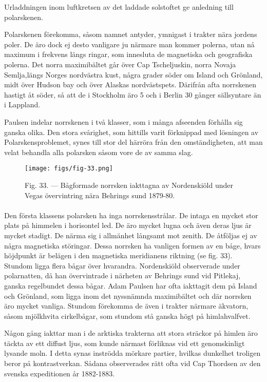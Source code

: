 \documentclass[a4paper, 12pt, oneside, swedish]{article}
\begin{document}
Urladdningen inom luftkretsen av det laddade solstoftet ge anledning till polarskenen.

Polarskenen förekomma, såsom namnet antyder, ymnigast i trakter nära jordens poler. De äro dock ej desto vanligare ju närmare man kommer polerna, utan nå maximum i frekvens längs ringar, som innesluta de magnetiska och geografiska polerna. Det norra maximibältet går över Cap Tscheljuskin, norra Novaja Semlja,längs Norges nordvästra kust, några grader söder om Island och Grönland, midt över Hudson bay och över Alaskas nordvästspets. Därifrån afta norrskenen hastigt åt söder, så att de i Stockholm äro 5 och i Berlin 30 gånger sällsyntare än i Lappland.

Paulsen indelar norrskenen i två klasser, som i många afseenden förhålla sig ganska olika. Den stora svårighet, som hittills varit förknippad med lösningen av Polarskensproblemet, synes till stor del härröra från den omständigheten, att man velat behandla alla polarsken såsom vore de av samma slag.

\begin{figure}[H]
\centering
\texttt{[image: figs/fig-33.png]}
\caption{Fig. 33. --- Bågformade norrsken iakttagna av Nordenskiöld under Vegas övervintring nära Behrings sund 1879-80.}
\end{figure}
\paragraph{}
Den första klassens polarsken ha inga norrskensstrålar. De intaga en mycket stor plats på himmelen i horisontel led. De äro mycket lugna och även deras ljus är mycket stadigt. De närma sig i allmänhet långsamt mot zenith. De åtföljas ej av några magnetiska störingar. Dessa norrsken ha vanligen formen av en båge, hvars höjdpunkt är belägen i den magnetiska meridianens riktning (se fig. 33). Stundom ligga flera bågar över hvarandra. Nordenskiöld observerade under polarnatten, då han övervintrade i närheten av Behrings sund vid Pitlekaj, ganska regelbundet dessa bågar. Adam Paulsen har ofta iakttagit dem på Island och Grönland, som ligga inom det nyssnämnda maximibältet och där norrsken äro mycket vanliga. Stundom förekomma de även i trakter närmare äkvatorn, såsom mjölkhvita cirkelbågar, som stundom stå ganska högt på himlahvalfvet.

Någon gång iakttar man i de arktiska trakterna att stora sträckor på himlen äro täckta av ett diffust ljus, som kunde närmast förliknas vid ett genomskinligt lysande moln. I detta synas inströdda mörkare partier, hvilkas dunkelhet troligen beror på kontrastverkan. Sådana observerades rätt ofta vid Cap Thordsen av den svenska expeditionen år 1882-1883.
\end{document}
